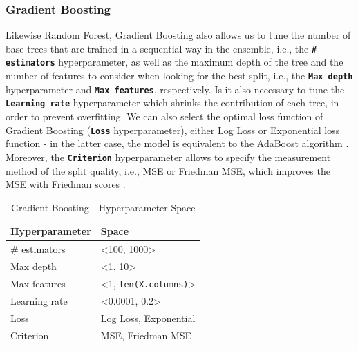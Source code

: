 \subsubsection{Gradient Boosting}
Likewise Random Forest, Gradient Boosting also allows us to tune the number of base trees that are trained in a sequential way in the ensemble, i.e., the \textbf{\texttt{\# estimators}} hyperparameter, as well as the maximum depth of the tree and the number of features to consider when looking for the best split, i.e., the \textbf{\texttt{Max depth}} hyperparameter and \textbf{\texttt{Max features}}, respectively.
Is it also necessary to tune the \textbf{\texttt{Learning rate}} hyperparameter which shrinks the contribution of each tree, in order to prevent overfitting.
We can also select the optimal loss function of Gradient Boosting (\textbf{\texttt{Loss}} hyperparameter), either Log Loss or Exponential loss function - in the latter case, the model is equivalent to the AdaBoost algorithm \citep{scikit-gb}.
Moreover, the \textbf{\texttt{Criterion}} hyperparameter allows to specify the measurement method of the split quality, i.e., MSE or Friedman MSE, which improves the MSE with Friedman scores \citep{scikit-gb}.

\begin{table}[H]
\small
\setlength{\tabcolsep}{8pt}
\renewcommand{\arraystretch}{1.3}
\centering
    \caption[Gradient Boosting - Hyperparameter Space]{Gradient Boosting - Hyperparameter Space}\label{tab:gbspace}
    \begin{tabular}{ll}
\toprule
\textbf{Hyperparameter} & \textbf{Space}\\
\midrule
\hline
\# estimators & <100, 1000> \\
Max depth & <1, 10> \\
Max features & <1, \verb|len(X.columns)|>  \\
Learning rate & <0.0001, 0.2> \\
Loss & Log Loss, Exponential \\
Criterion & MSE, Friedman MSE \\
\hline
\bottomrule
\end{tabular}
\vspace{0.7em}

\vspace{-1em}
\end{table}

